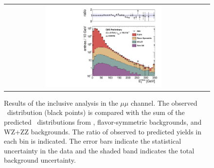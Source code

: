 \clearpage

\begin{figure}[!h]
\begin{center}
\begin{tabular}{cc}
\includegraphics[width=0.6\textwidth]{plots/pfmet_mm_19fb.pdf}
\end{tabular}
\caption{Results of the inclusive analysis in the $\mu\mu$ channel. The observed \MET\ distribution (black points) is compared with the sum of the predicted \MET\
distributions from \zjets, flavor-symmetric backgrounds, and WZ+ZZ backgrounds. The ratio of observed to predicted yields in each bin is
indicated. The error bars indicate the statistical uncertainty in the data and the shaded band indicates the total background uncertainty.
\label{fig:results_incl_mm}
}
\end{center}
\end{figure}

